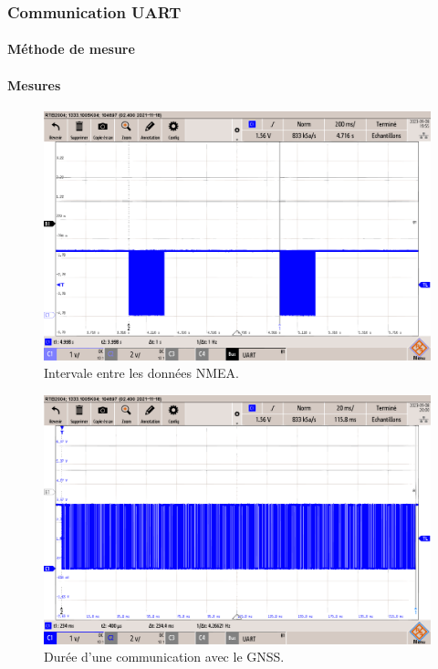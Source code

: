 \subsubsection{Communication UART} \label{ssec:Comm-UART}
\paragraph{Méthode de mesure}
\paragraph{Mesures}

\begin{figure}[!h]
	\centering
	\includegraphics[width=0.7\linewidth]{../figures/mesures/UART/interval-gnss}
	\caption{Intervale entre les données NMEA.}
	\label{fig:interval-gnss}
\end{figure}

\begin{figure}[!h]
	\centering
	\includegraphics[width=0.7\linewidth]{../figures/mesures/UART/duree-comm-gnss}
	\caption{Durée d'une communication avec le GNSS.}
	\label{fig:duree-comm-gnss}
\end{figure}

